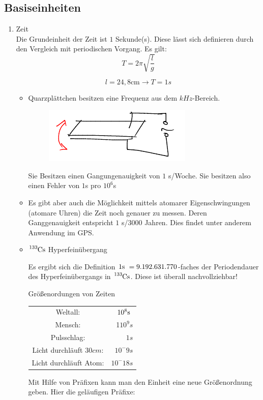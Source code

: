 \documentclass[a4paper,10pt]{scrartcl}
\begin{document}
 \subsection{Basiseinheiten}
 \begin{enumerate}[a]
\item Zeit \\
Die Grundeinheit der Zeit ist $1$ Sekunde(s).  Diese lässt sich definieren durch den Vergleich mit periodischen Vorgang. Es gilt:
\[
T=2\pi \sqrt{\frac{l}{g}}
\]

\[
l=24,8 \text{cm} \rightarrow T=1s
\]
\begin{itemize}
\item Quarzplättchen besitzen eine Frequenz aus dem $kHz$-Bereich.
\begin{figure}[h]
\includegraphics[scale=0.5]{fig5.png}
\end{figure}

Sie Besitzen einen Gangungenauigkeit von $1$ s/Woche. Sie besitzen also einen Fehler von $1$s pro $10^6$s
\item Es gibt aber auch die Möglichkeit mittels atomarer Eigenschwingungen (atomare Uhren) die Zeit noch genauer zu messen.  Deren Ganggenauigkeit entspricht $1$ s/$3000$ Jahren. Dies findet unter anderem Anwendung im GPS. 
\item $\ce{^{133}Cs}$ Hyperfeinübergang

Es ergibt sich die Definition $1\text{s }=9.192.631.770$-faches der Periodendauer des Hyperfeinübergangs in $\ce{^{133}Cs}$. Diese ist überall nachvollziehbar!

\begin{seg}{Größenordungen von Zeiten}
\begin{table}[h]
\begin{tabular}{c r}
Weltall: & $10^8 \text{s }$ \\
Mensch: & 1$10^9 s$ \\
Pulsschlag: & $1 s$ \\
Licht durchläuft $30 cm$: & $10^-9 s$ \\
Licht durchläuft Atom: & $10^-18 s$
\end{tabular}
\end{table}
Mit Hilfe von Präfixen kann man den Einheit eine neue Größenordnung geben. Hier die geläufigen Präfixe:


\end{seg}
\end{itemize}
\end{enumerate}
\end{document}
